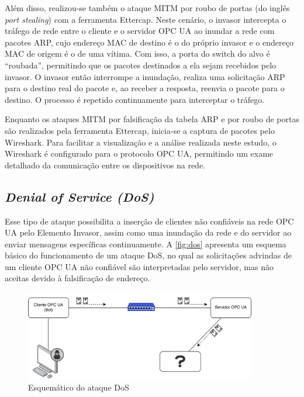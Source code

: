         Além disso, realizou-se também o ataque MITM por roubo de portas (do inglês \textit{port stealing}) com a ferramenta Ettercap. Neste cenário, o invasor intercepta o tráfego de rede entre o cliente e o servidor OPC UA ao inundar a rede com pacotes ARP, cujo endereço MAC de destino é o do próprio invasor e o endereço MAC de origem é o de uma vítima. Com isso, a porta do switch do alvo é ``roubada'', permitindo que os pacotes destinados a ela sejam recebidos pelo invasor. O invasor então interrompe a inundação, realiza uma solicitação ARP para o destino real do pacote e, ao receber a resposta, reenvia o pacote para o destino. O processo é repetido continuamente para interceptar o tráfego.

        Enquanto os ataques MITM por falsificação da tabela ARP e por roubo de portas são realizados pela ferramenta Ettercap, inicia-se a captura de pacotes pelo Wireshark. Para facilitar a visualização e a análise realizada neste estudo, o Wireshark é configurado para o protocolo OPC UA, permitindo um exame detalhado da comunicação entre os dispositivos na rede.
    
    \subsection{\textit{Denial of Service (DoS)}}

        Esse tipo de ataque possibilita a inserção de clientes não confiáveis na rede OPC UA pelo Elemento Invasor, assim como uma inundação da rede e do servidor ao enviar mensagens específicas continuamente. A \autoref{fig:dos} apresenta um esquema básico do funcionamento de um ataque DoS, no qual as solicitações advindas de um cliente OPC UA não confiável são interpretadas pelo servidor, mas não aceitas devido à falsificação de endereço.

        \begin{figure}[htbp]
            \caption{\label{fig:dos}Esquemático do ataque DoS}
            \begin{center}
                \includegraphics[width=0.9\textwidth]{USPSC-img/dos.png}
            \end{center}
        \end{figure}
        
